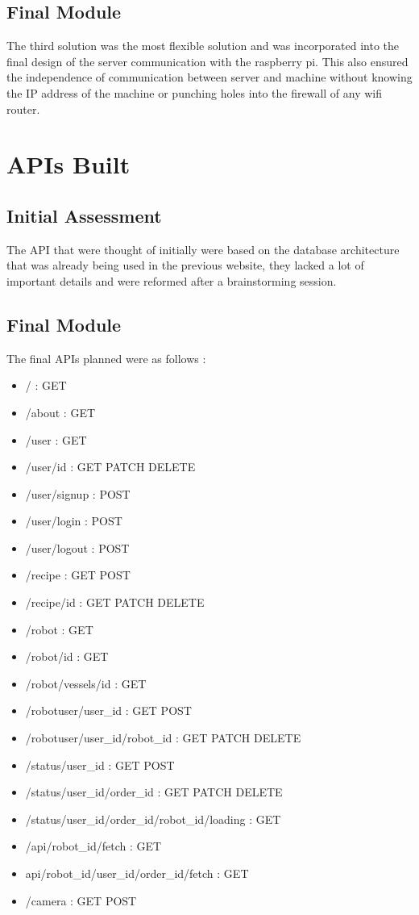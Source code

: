 \subsection{Final Module}
{\normalsize The third solution was the most flexible solution and was incorporated into the final design of the server communication with the raspberry pi. This also ensured the independence of communication between server and machine without knowing the IP address of the machine or punching holes into the firewall of any wifi router. 
}
\section{APIs Built}
\subsection{Initial Assessment}
{\normalsize The API that were thought of initially were based on the database architecture that was already being used in the previous website, they lacked a lot of important details and were reformed after a brainstorming session. \\[0.1in]
}
\subsection{Final Module}
{\normalsize The final APIs planned were as follows : 
    \begin{itemize}
        \item / : GET 
        \item /about : GET
        \item /user : GET
        \item /user/{id} : GET PATCH DELETE
        \item /user/signup : POST 
        \item /user/login : POST
        \item /user/logout : POST
        \item /recipe : GET POST
        \item /recipe/{id} : GET PATCH DELETE
        \item /robot : GET 
        \item /robot/{id} : GET 
        \item /robot/vessels/{id} : GET
        \item /robotuser/{user\_id} : GET POST
        \item /robotuser/{user\_id}/{robot\_id} : GET PATCH DELETE
        \item /status/{user\_id} : GET POST
        \item /status/{user\_id}/{order\_id} : GET PATCH DELETE
        \item /status/{user\_id}/{order\_id}/{robot\_id}/loading : GET
        \item /api/robot\_id/fetch : GET
        \item api/robot\_id/user\_id/order\_id/fetch : GET
        \item /camera : GET POST
    \end{itemize}
}

